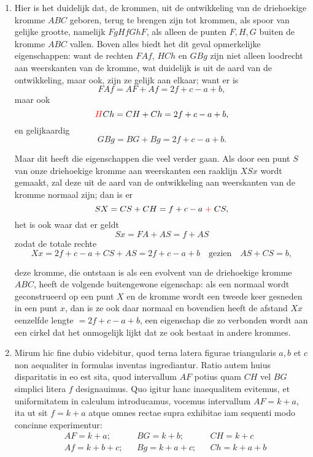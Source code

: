 \documentclass[10pt,a4paper]{article}
\newcommand{\switchenum}{\setcounter{enumi}{\arabic{enumi}-1}\switchcolumn}
\begin{document}
\begin{paracol}{2}
\begin{enumerate}[topsep=1px]
		\switchenum
		\item Hier is het duidelijk dat, de krommen, uit de ontwikkeling van de driehoekige kromme $ABC$ geboren, terug te brengen zijn tot krommen, als spoor van gelijke grootte, namelijk $FgHfGhF$, als alleen de punten $F, H, G$ buiten de kromme $ABC$ vallen. Boven alles biedt het dit geval opmerkelijke eigenschappen: want de rechten $FAf$, $HCh$ en $GBg$ zijn niet alleen loodrecht aan weerskanten van de kromme, wat duidelijk is uit de aard van de ontwikkeling, maar ook, zijn ze gelijk aan elkaar; want er is
		\[
			F A f = AF + Af = 2f + c - a + b,
		\]
		maar ook
		\[
			{\color{red}H} C h = CH + Ch = 2f + c - a + b,
		\]
		en gelijkaardig
		\[
			G B g = BG + Bg = 2f + c - a + b.
		\]
		\par Maar dit heeft die eigenschappen die veel verder gaan. Als door een punt $S$ van onze driehoekige kromme aan weerskanten een raaklijn $XSx$ wordt gemaakt, zal deze uit de aard van de ontwikkeling aan weerskanten van de kromme normaal zijn; dan is er 		
		\[
			SX = CS + CH = f + c - a {\color{red}\;+\;} CS,
		\]
		het is ook waar dat er geldt
		\[
			Sx = FA + AS = f + AS
		\]
		zodat de totale rechte
		\[
			Xx = 2f + c - a + CS + AS = 2f + c - a + b \quad\text{gezien}\quad AS + CS = b,
		\]
		\newpage
		\par deze kromme, die ontstaan is als een evolvent van de driehoekige kromme $ABC$, heeft de volgende buitengewone eigenschap: als een normaal wordt geconstrueerd op een punt $X$ en de kromme wordt een tweede keer gesneden in een punt $x$, dan is ze ook daar normaal en bovendien heeft de afstand $Xx$ eenzelfde lengte $= 2f+c-a+b$, een eigenschap die zo verbonden wordt aan een cirkel dat het onmogelijk lijkt dat ze ook bestaat in andere krommes.
		
		\switchcolumn*
		
		\item Mirum hic fine dubio videbitur, quod terna latera figurae triangularis $a,b$ et $c$ non aequaliter in formulas inventas ingrediantur. Ratio autem huius disparitatis in eo est sita, quod intervallum $AF$ potius quam $CH$ vel $BG$ simplici litera $f$ designauimus. Quo igitur hanc inaequalitem evitemus, et uniformitatem in calculum introducamus, vocemus intervallum $AF = k+a$, ita ut sit $f=k+a$ atque omnes rectae supra exhibitae iam sequenti modo concinne experimentur:
		\begin{align*}
			&AF = k+a;  &&BG = k+b;   &&CH = k+c\\
			&Af = k+b+c;  &&Bg = k+a+c; &&Ch = k+a+b
		\end{align*}
		

\end{enumerate}
\end{paracol}
\end{document}
